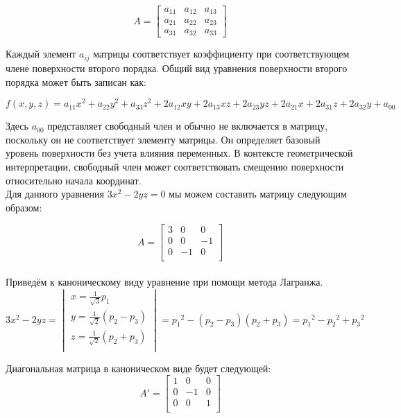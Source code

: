 \documentclass{article}
\begin{document}
\[
A = \begin{bmatrix}
a_{11} & a_{12} & a_{13} \\
a_{21} & a_{22} & a_{23} \\
a_{31} & a_{32} & a_{33}
\end{bmatrix}
\]

Каждый элемент \(a_{ij}\) матрицы соответствует коэффициенту при соответствующем члене поверхности второго порядка. Общий вид уравнения поверхности второго порядка может быть записан как:

\[
f(x, y, z) = a_{11}x^2 + a_{22}y^2 + a_{33}z^2 + 2a_{12}xy + 2a_{13}xz + 2a_{23}yz + 2a_{21}x + 2a_{31}z + 2a_{32}y + a_{00}
\]

Здесь \(a_{00}\) представляет свободный член и обычно не включается в матрицу, поскольку он не соответствует элементу матрицы. Он определяет базовый уровень поверхности без учета влияния переменных. В контексте геометрической интерпретации, свободный член может соответствовать смещению поверхности относительно начала координат.
\\ 


Для данного уравнения \(3x^2 - 2yz = 0\) мы можем составить матрицу следующим образом:

\[
A = \begin{bmatrix}
3 & 0 & 0 \\
0 & 0 & -1 \\
0 & -1 & 0 \\
\end{bmatrix}
\]
\\


Приведём к каноническому виду уравнение при помощи метода Лагранжа.
\[
3x^2-2yz=
\begin{vmatrix}
 x=\frac{1}{\sqrt{3}}p_1\\
y=\frac{1}{\sqrt{2}}(p_2-p_3)\\
z=\frac{1}{\sqrt{2}}(p_2+p_3)\\
\end{vmatrix}=
{p_1}^2-\left(p_2-p_3\right)\left(p_2+p_3\right)={p_1}^2-{p_2}^2+{p_3}^2
\]


Диагональная матрица в каноническом виде будет следующей:\\
\[
A'=
\begin{bmatrix}
1 & 0 & 0 \\
0 & -1 & 0 \\
0 & 0 & 1 \\
\end{bmatrix}
\]
\\ \\
\end{document}
